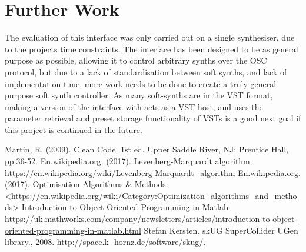 \documentclass[11pt, oneside]{report}   	%
\begin{document}
\section{Further Work}
The evaluation of this interface was only carried out on a single synthesiser, due to the projects time constraints. The interface has been designed to be as general purpose as possible, allowing it to control arbitrary synths over the OSC protocol, but due to a lack of standardisation between soft synths, and lack of implementation time, more work needs to be done to create a truly general purpose soft synth controller. As many soft-synths are in the VST format, making a version of the interface with acts as a VST host, and uses the parameter retrieval and preset storage functionality of VSTs is a good next goal if this project is continued in the future.

\begin{thebibliography}{9}
\singlespacing
{}
Martin, R. (2009). Clean Code. 1st ed. Upper Saddle River, NJ: Prentice Hall, pp.36-52.
En.wikipedia.org. (2017). Levenberg-Marquardt algorithm. \\
\url{https://en.wikipedia.org/wiki/Levenberg-Marquardt_algorithm}
En.wikipedia.org. (2017). Optimisation Algorithms \& Methods.
\url{<https://en.wikipedia.org/wiki/Category:Optimization_algorithms_and_methods>}
Introduction to Object Oriented Programming in Matlab\\
\url{https://uk.mathworks.com/company/newsletters/articles/introduction-to-object-oriented-programming-in-matlab.html}
Stefan Kersten. skUG SuperCollider UGen library., 2008. \url{http://space.k- hornz.de/software/skug/}.
\end{thebibliography}
\end{document}
